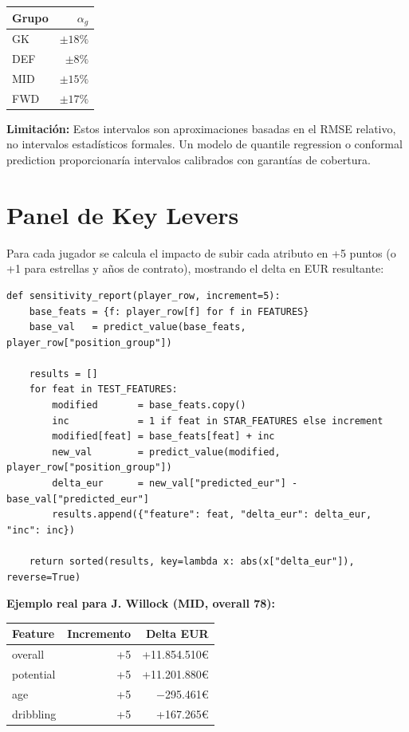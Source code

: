 \documentclass[12pt,a4paper]{report}
\begin{document}
\begin{center}
\begin{tabular}{lr}
\toprule
\textbf{Grupo} & $\alpha_g$ \\
\midrule
GK  & $\pm 18\%$ \\
DEF & $\pm 8\%$ \\
MID & $\pm 15\%$ \\
FWD & $\pm 17\%$ \\
\bottomrule
\end{tabular}
\end{center}

\begin{warningbox}
\textbf{Limitación:} Estos intervalos son aproximaciones basadas en el RMSE relativo, no intervalos estadísticos formales. Un modelo de quantile regression o conformal prediction proporcionaría intervalos calibrados con garantías de cobertura.
\end{warningbox}

\section{Panel de Key Levers}

Para cada jugador se calcula el impacto de subir cada atributo en +5 puntos (o +1 para estrellas y años de contrato), mostrando el delta en EUR resultante:

\begin{lstlisting}[caption={Cálculo del panel de palancas clave}]
def sensitivity_report(player_row, increment=5):
    base_feats = {f: player_row[f] for f in FEATURES}
    base_val   = predict_value(base_feats, player_row["position_group"])

    results = []
    for feat in TEST_FEATURES:
        modified       = base_feats.copy()
        inc            = 1 if feat in STAR_FEATURES else increment
        modified[feat] = base_feats[feat] + inc
        new_val        = predict_value(modified, player_row["position_group"])
        delta_eur      = new_val["predicted_eur"] - base_val["predicted_eur"]
        results.append({"feature": feat, "delta_eur": delta_eur, "inc": inc})

    return sorted(results, key=lambda x: abs(x["delta_eur"]), reverse=True)
\end{lstlisting}

\textbf{Ejemplo real para J. Willock (MID, overall 78):}

\begin{center}
\begin{tabular}{lrr}
\toprule
\textbf{Feature} & \textbf{Incremento} & \textbf{Delta EUR} \\
\midrule
overall    & +5 & +11.854.510€ \\
potential  & +5 & +11.201.880€ \\
age        & +5 & $-$295.461€ \\
dribbling  & +5 & +167.265€ \\
\bottomrule
\end{tabular}
\end{center}
\end{document}
